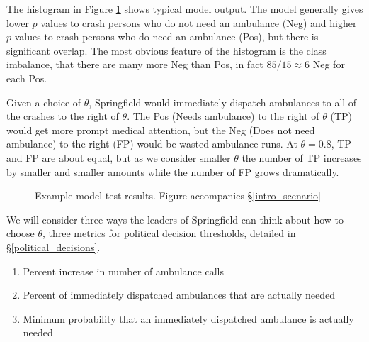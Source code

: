 The histogram in Figure \ref{intro_ideal} shows typical model output.  The model generally gives lower $p$ values to crash persons who do not need an ambulance (Neg) and higher $p$ values to crash persons who do need an ambulance (Pos), but there is significant overlap.  The most obvious feature of the histogram is the class imbalance, that there are many more Neg than Pos, in fact $85/15 \approx 6$ Neg for each Pos.  

  Given a choice of $\theta$, Springfield would immediately dispatch ambulances to all of the crashes to the right of $\theta$.  The Pos (Needs ambulance) to the right of $\theta$ (TP) would get more prompt medical attention, but the Neg (Does not need ambulance) to the right (FP) would be wasted ambulance runs.  At $\theta = 0.8$, TP and FP are about equal, but as we consider smaller $\theta$ the number of TP increases by smaller and smaller amounts while the number of FP grows dramatically.  

\begin{figure}[h]
\centering
		
\caption{\normalfont\normalsize Example model test results.  Figure accompanies \S\ref{intro_scenario}}
\label{intro_ideal}
\end{figure}

\FloatBarrier

We will consider three ways the leaders of Springfield can think about how to choose $\theta$, three metrics for political decision thresholds, detailed in \S \ref{political_decisions}.

\begin{enumerate}
	\item Percent increase in number of ambulance calls
	\item Percent of immediately dispatched ambulances that are actually needed
	\item Minimum probability that an immediately dispatched ambulance is actually needed
\end{enumerate}







